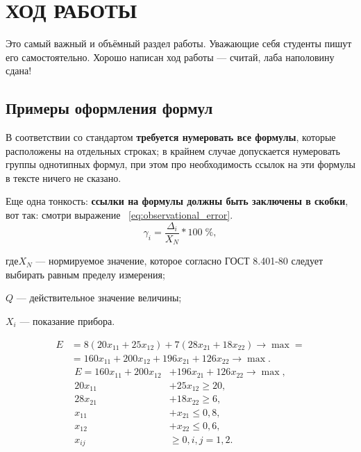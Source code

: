 \section{ХОД РАБОТЫ}

Это самый важный и объёмный раздел работы. Уважающие себя студенты пишут его самостоятельно.
Хорошо написан ход работы --- считай, лаба наполовину сдана!

\subsection{Примеры оформления формул}

В соответствии со стандартом \textbf{требуется нумеровать все 
формулы}, которые расположены на отдельных строках; в крайнем случае допускается нумеровать
группы однотипных формул, при этом про необходимость ссылок на эти формулы в тексте ничего не сказано.

Еще одна тонкость: \textbf{ссылки на формулы должны быть заключены в скобки}, вот так: смотри выражение ~\eqref{eq:observational_error}.
\begin{equation}
  \label{eq:observational_error}
  \gamma_{i} = \dfrac{\Delta_{i}}{X_{N}}*100\;\%,
\end{equation}

\noindent где\hspace{1em}$ X_{N} $ --- нормируемое значение, которое согласно ГОСТ 8.401-80
следует выбирать равным пределу измерения;

$ Q $ --- действительное значение величины;

$ X_{i} $ --- показание прибора.

\begin{equation}
  \label{eq:BaseOpt}
  \begin{aligned}
    E &= 8(20x_{11} + 25x_{12}) + 7(28x_{21} + 18x_{22}) \rightarrow \max = \\
    &= 160x_{11} + 200x_{12} + 196x_{21} + 126x_{22} \rightarrow \max.
  \end{aligned}
\end{equation}
\begin{equation}
  \label{eq:BaseNSM}
    \begin{aligned}
      E = 160x_{11} + 200x_{12} &+ 196x_{21} + 126x_{22} \rightarrow \max, \\
      20x_{11} &+ 25x_{12} \ge 20, \\
      28x_{21} &+ 18x_{22} \ge 6, \\
      x_{11} &+ x_{21} \le 0{,}8, \\
      x_{12} &+ x_{22} \le 0{,}6, \\
      x_{ij} & \ge 0, i, j = 1, 2.
    \end{aligned}
\end{equation}

